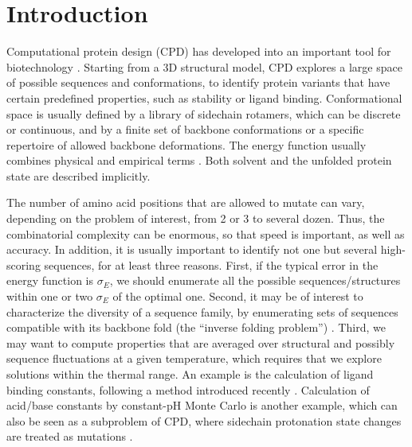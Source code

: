 \documentclass[a4paper,12pt]{article}
\begin{document}
\pagebreak

\section{Introduction}
Computational protein design (CPD) has developed into an important tool for biotechnology \cite{Dantas03,
Kuhlman06,Lippow07,Saven11,Feldmeier13,Tinberg13}. Starting from a 3D structural model, CPD explores a large
space of possible sequences and conformations, to identify protein variants that have certain predefined properties,
such as stability or ligand binding. Conformational space is usually defined by a library of sidechain rotamers,
which can be discrete or continuous, and by a finite set of backbone conformations or a specific repertoire
of allowed backbone deformations. The energy function usually combines physical and empirical terms \cite{Pokala04,
Samish11,Li13}. Both solvent and the unfolded protein state are described implicitly. 

The number of amino acid positions that are allowed to mutate can vary, depending on the problem of interest,
from 2 or 3 to several dozen. Thus, the combinatorial complexity can be enormous, so that speed is important,
as well as accuracy. In addition, it is usually important to identify not one but several high-scoring sequences,
for at least three reasons. First, if the typical error in the energy function is $\sigma_E$, we should enumerate
all the possible sequences/structures within one or two $\sigma_E$ of the optimal one. Second, it may be of
interest to characterize the diversity of a sequence family, by enumerating sets of sequences compatible with
its backbone fold (the ``inverse folding problem'') \cite{Ponder87,Koehl02,Larson02,Schmidt09,Schmidt10}. Third,
we may want to compute properties that are averaged over structural and possibly sequence fluctuations at a given
temperature, which requires that we explore solutions within the thermal range. An example is the calculation of
ligand binding constants, following a method introduced recently \cite{Druart15}. Calculation of acid/base constants
by constant-pH Monte Carlo is another example, which can also be seen as a  subproblem of CPD, where sidechain
protonation state changes are treated as mutations \cite{Aleksandrov10b,Polydorides13,Kilambi12}.
\end{document}
